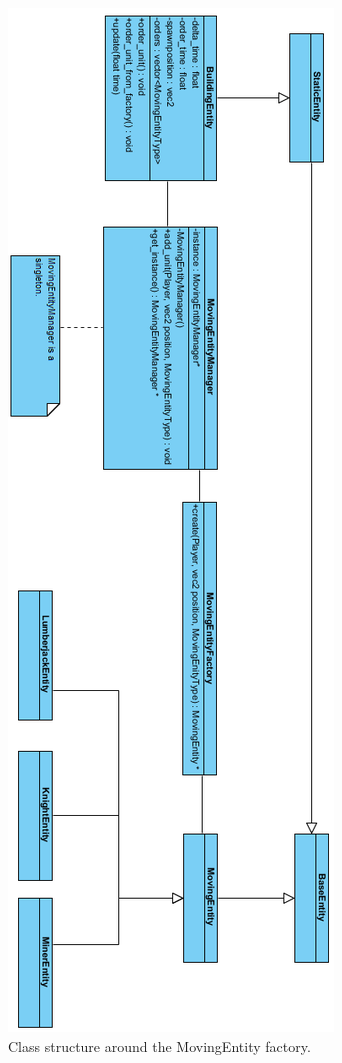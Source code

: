\begin{figure}[!htb]
    \centering
    \includegraphics[scale=0.70]{res/MovingEntityFactoryClassRotated.png}
    \caption{Class structure around the MovingEntity factory.}
\end{figure}

